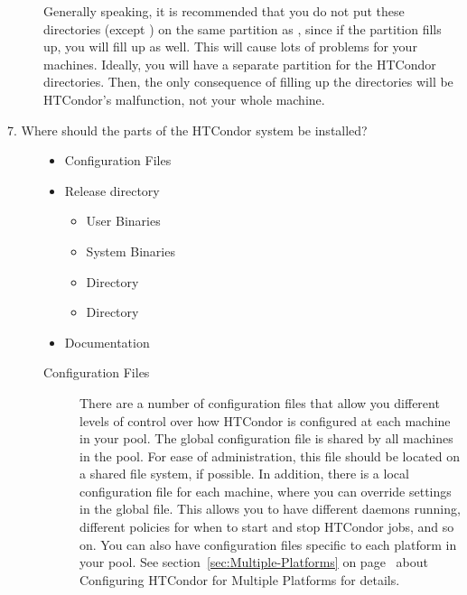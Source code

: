 \begin{description}
\begin{description}
\end{description}

Generally speaking, it is recommended that you do not put these directories
(except ) on the same partition as ,
since if the partition
fills up, you will fill up  as well. 
This will cause lots of
problems for your machines.  Ideally, you will have a separate partition
for the HTCondor directories. Then, the only consequence of filling up
the directories
will be HTCondor's malfunction, not your whole machine.

\item[7. Where should the parts of the HTCondor system be installed?]

	\begin{itemize}
	\item Configuration Files
	\item Release directory
		\begin{itemize}
		\item User Binaries
		\item System Binaries 
		\item {} Directory
	  	\item {} Directory
		\end{itemize}
	\item Documentation
	\end{itemize}

\label{sec:Config-File-Locations}
\begin{description}
\item[Configuration Files] There are a number of configuration files
that allow you
different levels of control over how HTCondor is configured at each
machine in your pool.  
The global configuration file is shared by all machines in the pool.
For ease of administration, this file should be located on a shared
file system, if possible.
In addition, there is a local
configuration file for each machine, where you can override settings in the
global file.  This allows you to have different daemons running,
different policies for when to start and stop HTCondor jobs, and so on.
You can also have configuration files specific to each platform in your pool.
See
section~\ref{sec:Multiple-Platforms} on
page~\pageref{sec:Multiple-Platforms} about Configuring HTCondor for
Multiple Platforms for details.


\end{description}
\end{description}
